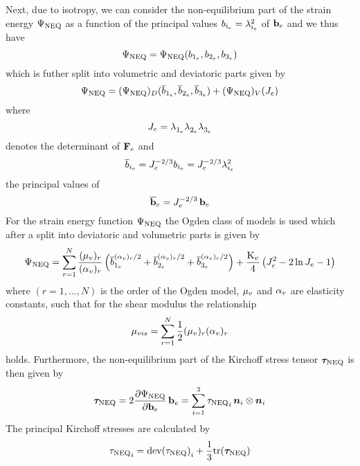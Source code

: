 Next, due to isotropy, we can consider the non-equilibrium part of the strain energy \(\Psi_{\text{NEQ}}\) as a function of the principal values \(b_{{i}_e} = \lambda^{2}_{{i}_e}\) of \(\mathbf{b}_{e}\) and we thus have
\begin{equation}
    \Psi_{\text{NEQ}} = \Psi_{\text{NEQ}} (b_{{1}_e}, b_{{2}_e}, b_{{3}_e})
\end{equation}
which is futher split into volumetric and deviatoric parts given by
\begin{equation}
    \Psi_{\text{NEQ}} = ({\Psi_{\text{NEQ}}})_{D} (\overline{b}_{{1}_e}, \overline{b}_{{2}_e}, \overline{b}_{{3}_e}) + ({\Psi_{\text{NEQ}}})_{V} (J_{e})
\end{equation}
where 
\begin{equation}
    J_{e} = \lambda^{}_{{1}_e} \lambda^{}_{{2}_e} \lambda^{}_{{3}_e}
    \label{eq:jacobian_neq}
\end{equation}
denotes the determinant of \(\mathbf{F}_{e}\) and
\begin{equation}
    \overline{b}_{{i}_e} = J_{e}^{-2/3} b_{{i}_e} = J_{e}^{-2/3} \lambda^{2}_{{i}_e}
    \label{eq:principal_be_dev}
\end{equation}
the principal values of 
\begin{equation}
    \mathbf{\overline{b}}_{e} = J_{e}^{-2/3} \, \mathbf{b}_{e}
\end{equation}
For the strain energy function \(\Psi_{\text{NEQ}}\) the Ogden class of models is used which after a split into deviatoric and volumetric parts is given by
\begin{equation}
    \Psi_{\text{NEQ}} = \sum_{r=1}^{N} \frac{(\mu_{v})_{r}}{(\alpha_{v})_{r}}
     \left(\overline{b}_{{1}_e}^{(\alpha_{v})_{r}/2} + \overline{b}_{{2}_e}^{(\alpha_{v})_{r}/2} + \overline{b}_{{3}_e}^{(\alpha_{v})_{r}/2}\right) 
     + \dfrac{\mathrm{K}_{v}}{4}\left( J_{e}^2 - 2 \ln J_{e} -1 \right)
     \label{eq:strain_energy_neq}
\end{equation}
where \((r = 1, \ldots , N)\) is the order of the Ogden model, \(\mu_{v}\) and \(\alpha_{v}\) are elasticity constants, such that for the shear modulus the relationship
\begin{equation}
    \mu_{vis} = \sum_{r=1}^{N} \frac{1}{2} (\mu_{v})_{r} (\alpha_{v})_{r}
\end{equation}
holds. Furthermore, the non-equilibrium part of the Kirchoff stress tensor \(\bm{\tau}_{\text{NEQ}}\) is then given by
\begin{equation}
    \bm{\tau}_{\text{NEQ}} = 2 \pdv{\Psi_{\text{NEQ}}}{\mathbf{b}_{e}}\, \mathbf{b}_{e} 
    = \sum_{i=1}^{3} {{\tau}_{\text{NEQ}}}_{i} \, \bm{n}_{i} \otimes \bm{n}_{i}
\end{equation}
The principal Kirchoff stresses are calculated by
\begin{equation}
    {{\tau}_{\text{NEQ}}}_{i} = {\text{dev}({\tau}_{\text{NEQ}})}_{i} +  \frac{1}{3} \text{tr}(\bm{\tau}_{\text{NEQ}})
    \label{eq:principal_kirchoff_stress}
\end{equation}
